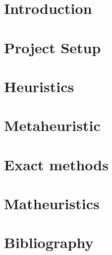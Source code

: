 \documentclass[a4paper,12pt]{report}
\newcommand\blankpage{%
    \null
    \thispagestyle{empty}%
    \addtocounter{page}{-1}%
    \newpage}
\begin{document}
\clearpage{\pagestyle{plain}\cleardoublepage}
\tableofcontents

\clearpage{\pagestyle{plain}\cleardoublepage}


\clearpage{\pagestyle{plain}\cleardoublepage}
\chapter{Introduction}


\clearpage{\pagestyle{plain}\cleardoublepage}
\chapter{Project Setup}


\clearpage{\pagestyle{plain}\cleardoublepage}
\chapter{Heuristics}


\clearpage{\pagestyle{plain}\cleardoublepage}
\chapter{Metaheuristic}


\clearpage{\pagestyle{plain}\cleardoublepage}
\chapter{Exact methods}


\clearpage{\pagestyle{plain}\cleardoublepage}
\chapter{Matheuristics}


\afterpage{\blankpage}
    
\clearpage{\pagestyle{plain}\cleardoublepage}
\chapter{Bibliography}

\end{document}
